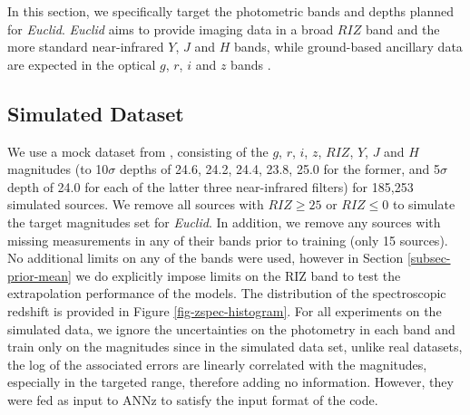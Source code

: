 \documentclass[useAMS,usenatbib,fleqn]{mn2e}
\begin{document}
In this section, we specifically target the photometric bands and depths planned for {\em Euclid}. {\em Euclid} aims to provide imaging data in a broad $RIZ$ band and the more standard near-infrared $Y$, $J$ and $H$ bands, while ground-based ancillary data are expected in the optical $g$, $r$, $i$ and $z$ bands \citep{laureijs2011}. 


\subsection{Simulated Dataset}
\label{sec-dataset}

We use a mock dataset from \citet{jouvel09}, consisting of the $g$, $r$, $i$, $z$, $RIZ$, $Y$, $J$ and $H$ magnitudes (to 10$\sigma$ depths of 24.6, 24.2, 24.4, 23.8, 25.0 for the former, and 5$\sigma$ depth of 24.0 for each of the latter three near-infrared filters) for 185,253 simulated sources. We remove all sources with $RIZ\ge25$ or $RIZ\le0$ to simulate the target magnitudes set for {\em Euclid}. In addition, we remove any sources with missing measurements in any of their bands prior to training (only 15 sources). No additional limits on any of the bands were used, however in Section \ref{subsec-prior-mean} we do explicitly impose limits on the RIZ band to test the extrapolation performance of the models. The distribution of the spectroscopic redshift is provided in Figure \ref{fig-zspec-histogram}. For all experiments on the simulated data, we ignore the uncertainties on the photometry in each band and train only on the magnitudes since in the simulated data set, unlike real datasets, the log of the associated errors are linearly correlated with the magnitudes, especially in the targeted range, therefore adding no information. However, they were fed as input to {\sc ANNz} to satisfy the input format of the code.
\end{document}
